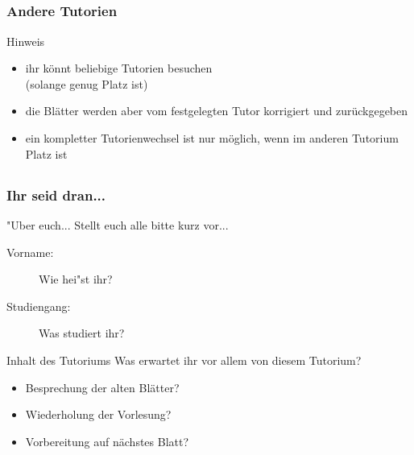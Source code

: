 \subsection*{}
\begin{frame}
        \frametitle{Andere Tutorien}
        \begin{block}{Hinweis}
              \begin{itemize}
                \item ihr könnt beliebige Tutorien besuchen\\ (solange genug Platz ist)
                \item die Blätter werden aber vom festgelegten Tutor korrigiert und zurückgegeben
                \item ein kompletter Tutorienwechsel ist nur möglich, wenn im anderen Tutorium Platz ist
              \end{itemize}
        \end{block}
\end{frame}


\subsection*{}
\begin{frame}
\frametitle{Ihr seid dran...}
	\begin{block}{"Uber euch...}
		Stellt euch alle bitte kurz vor... 
		\begin{description}
			\item[Vorname:]Wie hei"st ihr?
			\item[Studiengang:] Was studiert ihr?
		\end{description}
	\end{block}
  \pause
  	\begin{block}{Inhalt des Tutoriums}
		Was erwartet ihr vor allem von diesem Tutorium?
		\begin{itemize}\pause
			\item Besprechung der alten Blätter?\pause
			\item Wiederholung der Vorlesung?\pause
			\item Vorbereitung auf nächstes Blatt?
		\end{itemize}
	\end{block}
\end{frame}

